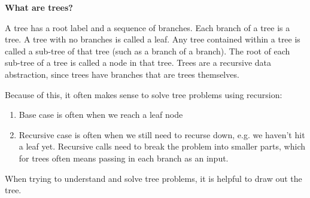 \textbf{What are trees?}

A tree has a root label and a sequence of branches. Each branch of a tree is a tree. A tree with no branches is called a leaf. Any tree contained within a tree is called a sub-tree of that tree (such as a branch of a branch). The root of each sub-tree of a tree is called a node in that tree.
Trees are a recursive data abstraction, since trees have branches that are trees themselves.

Because of this, it often makes sense to solve tree problems using recursion:
\begin{enumerate}
	\item Base case is often when we reach a leaf node
	\item Recursive case is often when we still need to recurse down, e.g. we haven’t hit a leaf yet. Recursive calls need to break the problem into smaller parts, which for trees often means passing in each branch as an input.
\end{enumerate}

When trying to understand and solve tree problems, it is helpful to draw out the tree.

